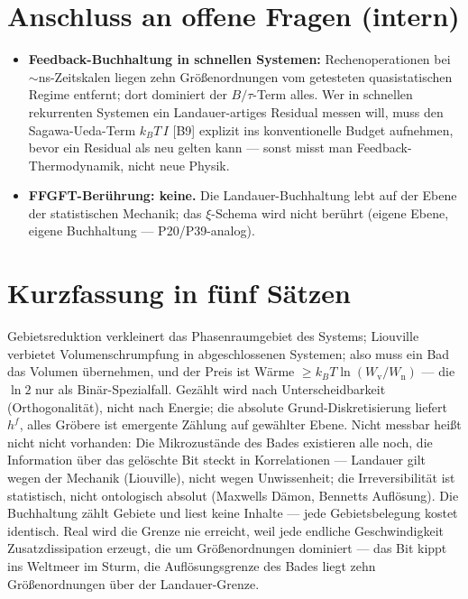 \documentclass[11pt,a4paper]{article}
\begin{document}
\section{Anschluss an offene Fragen (intern)}

\begin{itemize}[leftmargin=1.4em,itemsep=0.35em]
  \item \textbf{Feedback-Buchhaltung in schnellen Systemen:} Rechenoperationen bei
        ${\sim}$ns-Zeitskalen liegen zehn Größenordnungen vom getesteten
        quasistatischen Regime entfernt; dort dominiert der $B/\tau$-Term alles.
        Wer in schnellen rekurrenten Systemen ein Landauer-artiges Residual messen
        will, muss den Sagawa-Ueda-Term $k_B T\,I$ [B9] explizit ins konventionelle
        Budget aufnehmen, bevor ein Residual als neu gelten kann --- sonst misst
        man Feedback-Thermodynamik, nicht neue Physik.
  \item \textbf{FFGFT-Berührung: keine.} Die Landauer-Buchhaltung lebt auf der
        Ebene der statistischen Mechanik; das $\xi$-Schema wird nicht berührt
        (eigene Ebene, eigene Buchhaltung --- P20/P39-analog).
\end{itemize}

\section{Kurzfassung in fünf Sätzen}

Gebietsreduktion verkleinert das Phasenraumgebiet des Systems; Liouville verbietet
Volumenschrumpfung in abgeschlossenen Systemen; also muss ein Bad das Volumen
übernehmen, und der Preis ist Wärme
$\ge k_B T \ln(W_{\text{v}}/W_{\text{n}})$ --- die $\ln 2$ nur als
Binär-Spezialfall. Gezählt wird nach Unterscheidbarkeit (Orthogonalität), nicht
nach Energie; die absolute Grund-Diskretisierung liefert $h^f$, alles Gröbere ist
emergente Zählung auf gewählter Ebene. Nicht messbar heißt nicht nicht vorhanden:
Die Mikrozustände des Bades existieren alle noch, die Information über das
gelöschte Bit steckt in Korrelationen --- Landauer gilt wegen der Mechanik
(Liouville), nicht wegen Unwissenheit; die Irreversibilität ist statistisch, nicht
ontologisch absolut (Maxwells Dämon, Bennetts Auflösung). Die Buchhaltung zählt
Gebiete und liest keine Inhalte --- jede Gebietsbelegung kostet identisch. Real
wird die Grenze nie erreicht, weil jede endliche Geschwindigkeit
Zusatzdissipation erzeugt, die um Größenordnungen dominiert --- das Bit kippt ins
Weltmeer im Sturm, die Auflösungsgrenze des Bades liegt zehn Größenordnungen über
der Landauer-Grenze.
\end{document}
